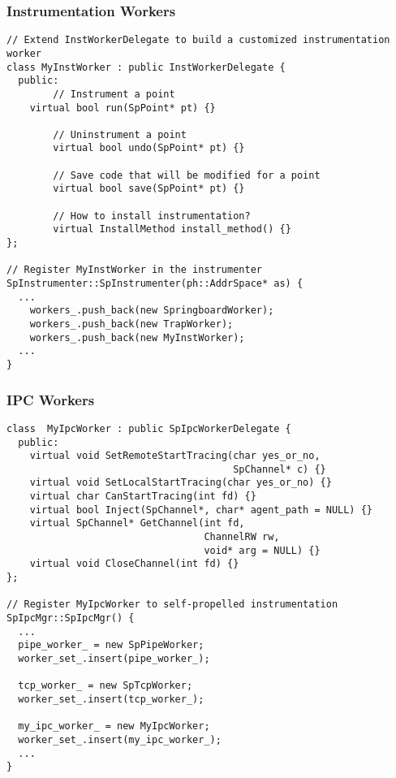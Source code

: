 \subsubsection{Instrumentation Workers}
\lstset{numbers=left}
\begin{lstlisting}[caption=Use customized instrumentation worker]
// Extend InstWorkerDelegate to build a customized instrumentation worker
class MyInstWorker : public InstWorkerDelegate {
  public:
		// Instrument a point
    virtual bool run(SpPoint* pt) {}

		// Uninstrument a point
		virtual bool undo(SpPoint* pt) {}

		// Save code that will be modified for a point
		virtual bool save(SpPoint* pt) {}

		// How to install instrumentation?
		virtual InstallMethod install_method() {}
};

// Register MyInstWorker in the instrumenter
SpInstrumenter::SpInstrumenter(ph::AddrSpace* as) {
  ...
	workers_.push_back(new SpringboardWorker);
	workers_.push_back(new TrapWorker);
	workers_.push_back(new MyInstWorker);
  ...
}
\end{lstlisting}


\subsubsection{IPC Workers}
\lstset{numbers=left}
\begin{lstlisting}[caption=Use customized IPC worker]
class  MyIpcWorker : public SpIpcWorkerDelegate {
  public:
    virtual void SetRemoteStartTracing(char yes_or_no,
                                       SpChannel* c) {}
    virtual void SetLocalStartTracing(char yes_or_no) {}
    virtual char CanStartTracing(int fd) {}
    virtual bool Inject(SpChannel*, char* agent_path = NULL) {}
    virtual SpChannel* GetChannel(int fd,
                                  ChannelRW rw,
                                  void* arg = NULL) {}
    virtual void CloseChannel(int fd) {}
};

// Register MyIpcWorker to self-propelled instrumentation
SpIpcMgr::SpIpcMgr() {
  ...
  pipe_worker_ = new SpPipeWorker;
  worker_set_.insert(pipe_worker_);

  tcp_worker_ = new SpTcpWorker;
  worker_set_.insert(tcp_worker_);
  
  my_ipc_worker_ = new MyIpcWorker;
  worker_set_.insert(my_ipc_worker_);
  ...
}
\end{lstlisting}
